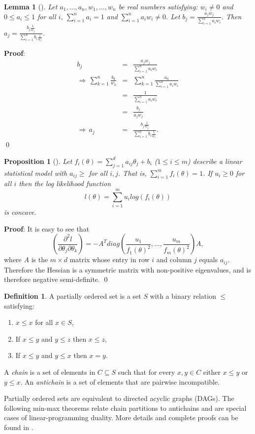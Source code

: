 \documentclass[12pt]{amsart}
\newtheorem{lemma}[thm]{Lemma}
\newtheorem{prop}[thm]{Proposition}
\theoremstyle{definition}
\newtheorem{defn}[thm]{Definition}
\begin{document}
\begin{lemma}[\cite{Li2009b}]
\label{lemma:readstoprobs}
Let $a_1,\ldots,a_n,w_1,\ldots,w_n$ be real numbers satisfying: $w_i \neq 0$ and $0 \leq a_i \leq 1$ for all $i$, $\sum_{i=1}^n a_i = 1$ and $\sum_{i=1}^na_iw_i \neq 0$.  Let 
$ b_j = \frac{a_jw_j}{\sum_{i=1}^n a_iw_i}$. Then $a_j = \frac{b_j\frac{1}{w_j}}{\sum_{i=1}^n b_i\frac{1}{w_i}}$.
\end{lemma}
{\bf Proof}: \begin{eqnarray}
b_j & =  & \frac{a_jw_j}{\sum_{i=1}^n a_iw_i} \\
\Rightarrow \,  \sum_{k=1}^n \frac{b_k}{w_k} & = &   \sum_{k=1}^n \frac{a_k}{\sum_{i=1}^na_iw_i}\\
&  = &  \frac{1}{\sum_{i=1}^n a_iw_i}\\
& = & \frac{b_j}{a_jw_j}\\
 \Rightarrow \,  a_j  & =  & \frac{b_j\frac{1}{w_j}}{\sum_{i=1}^n b_i \frac{1}{w_i}}.
\end{eqnarray} \qed
\begin{prop}[\cite{ASCB2005}]
\label{prop:linearmodel}
Let $f_i(\theta) = \sum_{j=1}^d a_{ij}\theta_j + b_i$ ($1 \leq i \leq
m$) describe a linear statistical model with $a_{ij} \geq$ for all
$i,j$.  That is, $\sum_{i=1}^m f_i(\theta) = 1$. If $u_i \geq 0$ for
all $i$ then the log likelihood function
\begin{equation}
l(\theta) = \sum_{i=1}^m u_i log(f_i(\theta))
\end{equation}
is concave.
\end{prop}
{\bf Proof}: It is easy to see that 
\begin{equation}
\left( \frac{\partial^2 l}{\partial \theta_j \partial \theta_k}  \right)  = -A^Tdiag\left( \frac{u_1}{f_1(\theta)^2},\ldots,\frac{u_m}{f_m(\theta)^2}\right) A,
\end{equation}
where $A$ is the $m \times d$ matrix whose entry in row $i$ and column
$j$ equals $a_{ij}$. Therefore the Hessian is a symmetric matrix with
non-positive eigenvalues, and is therefore negative semi-definite.
\qed

\begin{defn}
\label{def:po}
A partially ordered set is a set $S$ with a binary relation $\leq$
satisfying:
\begin{enumerate}
\item $x \leq x$ for all $x \in S$,
\item If $x \leq y$ and $y \leq z$ then $x \leq z$,
\item If $x \leq y$ and $y \leq x$ then $x=y$.
\end{enumerate}
A {\em chain} is a set of elements in $C \subseteq S$ such that for every
$x,y \in C$ either $x \leq y$ or $y \leq x$. An {\em antichain} is a set of
elements that are pairwise incompatible.
\end{defn}
Partially ordered sets are equivalent to directed acyclic graphs (DAGs). The following min-max theorems relate chain partitions to antichains and are special cases of linear-programming duality. More details and complete proofs can be found in \cite{Lovasz2009}.
\end{document}
